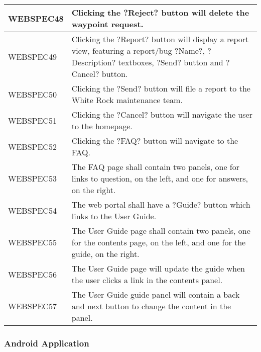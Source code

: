 \documentclass[11pt,a4paper]{article}
\begin{document}
\begin{longtable}{|p{2.5cm}p{13cm}|}
WEBSPEC48 & Clicking the ?Reject? button will delete the waypoint request. \\ \hline
WEBSPEC49 & Clicking the ?Report? button will display a report view, featuring a report/bug ?Name?, ?Description? textboxes, ?Send? button and ?Cancel? button. \\ \hline
WEBSPEC50 & Clicking the ?Send? button will file a report to the White Rock maintenance team. \\ \hline
WEBSPEC51 & Clicking the ?Cancel? button will navigate the user to the homepage. \\ \hline
WEBSPEC52 & Clicking the ?FAQ? button will navigate to the FAQ. \\ \hline
WEBSPEC53 & The FAQ page shall contain two panels, one for links to question, on the left, and one for answers, on the right. \\ \hline
WEBSPEC54 & The web portal shall have a ?Guide? button which links to the User Guide. \\ \hline
WEBSPEC55 & The User Guide page shall contain two panels, one for the contents page, on the left, and one for the guide, on the right. \\ \hline
WEBSPEC56 & The User Guide page will update the guide when the user clicks a link in the contents panel.  \\ \hline
WEBSPEC57 & The User Guide guide panel will contain a back and next button to change the content in the panel. \\ \hline
\end{longtable}

\subsubsection{Android Application}
\end{document}
